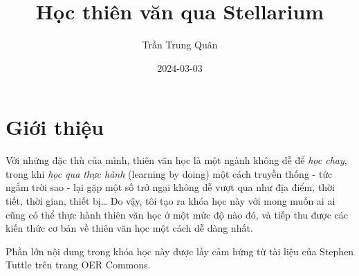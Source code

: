 \documentclass[
]{book}
\title{Học thiên văn qua Stellarium}
\author{Trần Trung Quân}
\date{2024-03-03}
\begin{document}
\maketitle

{
\setcounter{tocdepth}{1}
\tableofcontents
}
\hypertarget{giux1edbi-thiux1ec7u}{%
\chapter*{Giới thiệu}\label{giux1edbi-thiux1ec7u}}

Với những đặc thù của mình, thiên văn học là một ngành không dễ để \emph{học chay}, trong khi \emph{học qua thực hành} (learning by doing) một cách truyền thống - tức ngắm trời sao - lại gặp một số trở ngại không dễ vượt qua như địa điểm, thời tiết, thời gian, thiết bị\ldots{} Do vậy, tôi tạo ra khóa học này với mong muốn ai ai cũng có thể thực hành thiên văn học ở một mức độ nào đó, và tiếp thu được các kiến thức cơ bản về thiên văn học một cách dễ dàng nhất.

Phần lớn nội dung trong khóa học này được lấy cảm hứng từ tài liệu của Stephen Tuttle \citep{stuttle} trên trang OER Commons.

  
\end{document}
